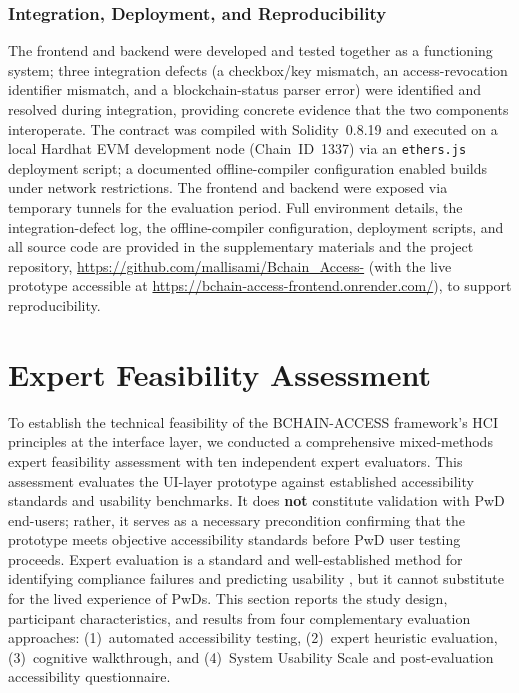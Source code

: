 \documentclass[journal,onecolumn]{IEEEtran}
\begin{document}
\subsubsection{Integration, Deployment, and Reproducibility}
\label{subsubsec:bugs}

The frontend and backend were developed and tested together as a functioning system; three integration defects (a checkbox/key mismatch, an access-revocation identifier mismatch, and a blockchain-status parser error) were identified and resolved during integration, providing concrete evidence that the two components interoperate. The contract was compiled with Solidity~0.8.19 and executed on a local Hardhat EVM development node (Chain~ID~1337) via an \texttt{ethers.js} deployment script; a documented offline-compiler configuration enabled builds under network restrictions. The frontend and backend were exposed via temporary tunnels for the evaluation period. Full environment details, the integration-defect log, the offline-compiler configuration, deployment scripts, and all source code are provided in the supplementary materials and the project repository, \url{https://github.com/mallisami/Bchain_Access-} (with the live prototype accessible at \url{https://bchain-access-frontend.onrender.com/}), to support reproducibility.

\section{Expert Feasibility Assessment}
\label{sec:feasibility}

To establish the technical feasibility of the BCHAIN-ACCESS framework's HCI principles at the interface layer, we conducted a comprehensive mixed-methods expert feasibility assessment with ten independent expert evaluators. This assessment evaluates the UI-layer prototype against established accessibility standards and usability benchmarks. It does \textbf{not} constitute validation with PwD end-users; rather, it serves as a necessary precondition confirming that the prototype meets objective accessibility standards before PwD user testing proceeds. Expert evaluation is a standard and well-established method for identifying compliance failures and predicting usability \cite{nielsen1992finding}, but it cannot substitute for the lived experience of PwDs. This section reports the study design, participant characteristics, and results from four complementary evaluation approaches: (1)~automated accessibility testing, (2)~expert heuristic evaluation, (3)~cognitive walkthrough, and (4)~System Usability Scale and post-evaluation accessibility questionnaire.
\end{document}
